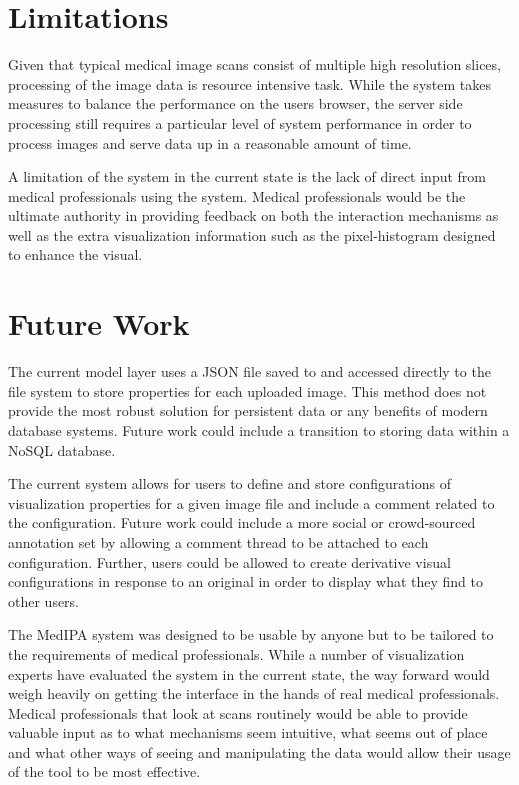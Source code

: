 \documentclass[annual]{acmsiggraph}
\begin{document}
\section{Limitations}
	Given that typical medical image scans consist of multiple high resolution slices, processing of the image data is resource intensive task.  While the system takes measures to balance the performance on the users browser, the server side processing still requires a particular level of system performance in order to process images and serve data up in a reasonable amount of time.

	A limitation of the system in the current state is the lack of direct input from medical professionals using the system.  Medical professionals would be the ultimate authority in providing feedback on both the interaction mechanisms as well as the extra visualization information such as the pixel-histogram designed to enhance the visual.

\section{Future Work} 
	The current model layer uses a JSON file saved to and accessed directly to the file system to store properties for each uploaded image.  This method does not provide the most robust solution for persistent data or any benefits of modern database systems.  Future work could include a transition to storing data within a NoSQL database.

	The current system allows for users to define and store configurations of visualization properties for a given image file and include a comment related to the configuration.  Future work could include a more social or crowd-sourced annotation set by allowing a comment thread to be attached to each configuration.  Further, users could be allowed to create derivative visual configurations in response to an original in order to display what they find to other users.

	The MedIPA system was designed to be usable by anyone but to be tailored to the requirements of medical professionals.  While a number of visualization experts have evaluated the system in the current state, the way forward would weigh heavily on getting the interface in the hands of real medical professionals.  Medical professionals that look at scans routinely would be able to provide valuable input as to what mechanisms seem intuitive, what seems out of place and what other ways of seeing and manipulating the data would allow their usage of the tool to be most effective.
\end{document}
